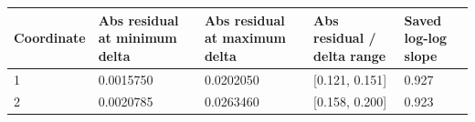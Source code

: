\begin{tabular}{lllll}
Coordinate & Abs residual at minimum delta & Abs residual at maximum delta & Abs residual / delta range & Saved log-log slope \\
\hline
1 & 0.0015750 & 0.0202050 & [0.121, 0.151] & 0.927 \\
2 & 0.0020785 & 0.0263460 & [0.158, 0.200] & 0.923 \\
\end{tabular}
